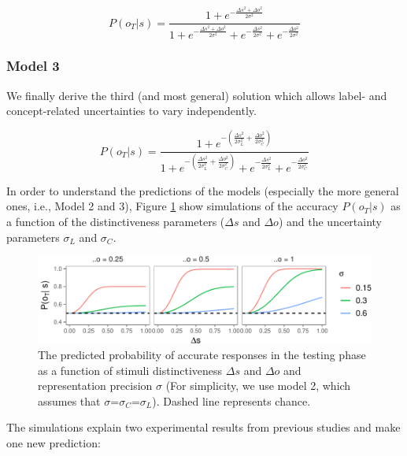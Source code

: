 \documentclass[english,,man]{apa6}
\theoremstyle{definition}
\theoremstyle{definition}
\theoremstyle{definition}
\theoremstyle{remark}
\begin{document}
\begin{equation} \label{eq:model2}
P(o_T|s)= \frac{1 + e^{- \frac{\Delta s^2 + \Delta o^2}{2\sigma^2}}}{1 + e^{-\frac{\Delta s^2 + \Delta o^2}{2\sigma^2}}+ e^{-\frac{\Delta s^2}{2\sigma^2}} + e^{-\frac{\Delta o^2}{2\sigma^2}}}
\end{equation}

\subsubsection{Model 3}\label{model-3}

We finally derive the third (and most general) solution which allows
label- and concept-related uncertainties to vary independently.

\begin{equation} \label{eq:model3}
P(o_T|s)= \frac{1 + e^{- (\frac{\Delta s^2}{2\sigma_L^2}+ \frac{\Delta o^2}{2\sigma_C^2})}}{1 + e^{-(\frac{\Delta s^2}{2\sigma_L^2}+ \frac{\Delta o^2}{2\sigma_C^2})}+ e^{-\frac{\Delta s^2}{2\sigma_L^2}} + e^{-\frac{\Delta o^2}{2\sigma_C^2}}}
\end{equation}

In order to understand the predictions of the models (especially the
more general ones, i.e., Model 2 and 3), Figure \ref{fig:simulation}
show simulations of the accuracy \(P(o_T|s)\) as a function of the
distinctiveness parameters (\(\Delta s\) and \(\Delta o\)) and the
uncertainty parameters \(\sigma_L\) and \(\sigma_C\).

\begin{figure}[htbp]
\centering
\includegraphics{ms_blind_files/figure-latex/simulation-1.pdf}
\caption{\label{fig:simulation}The predicted probability of accurate
responses in the testing phase as a function of stimuli distinctiveness
\(\Delta s\) and \(\Delta o\) and representation precision \(\sigma\)
(For simplicity, we use model 2, which assumes that
\(\sigma\)=\(\sigma_C\)=\(\sigma_L\)). Dashed line represents chance.}
\end{figure}

The simulations explain two experimental results from previous studies
and make one new prediction:
\end{document}
